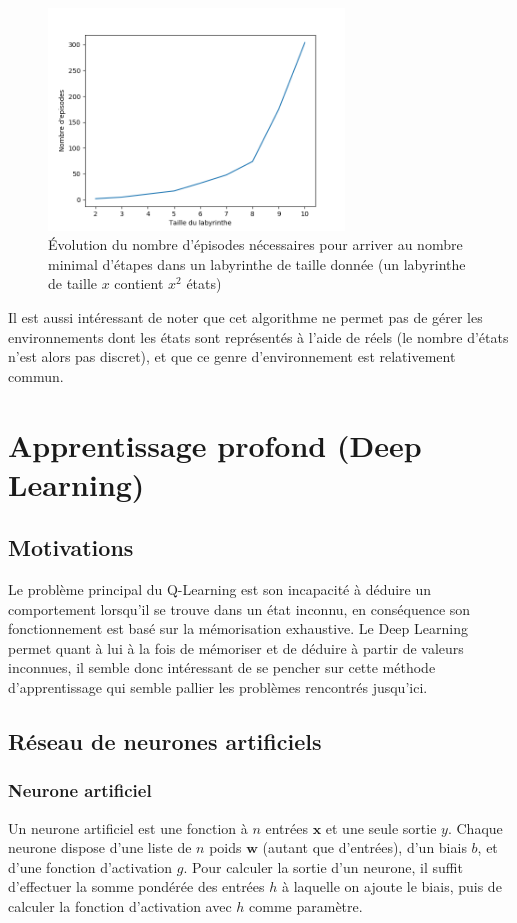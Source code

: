 \begin{figure}
    \centering
    \includegraphics[width=0.7\textwidth]{images/graph_ep_maze.png}
    \caption{Évolution du nombre d'épisodes nécessaires pour arriver au nombre minimal d'étapes dans un labyrinthe de taille donnée (un labyrinthe de taille $x$ contient $x^2$ états)}
\end{figure}

\par
Il est aussi intéressant de noter que cet algorithme ne permet pas de gérer les environnements dont les états sont représentés à l'aide de réels (le nombre d'états n'est alors pas discret), et que ce genre d'environnement est relativement commun.


\section{Apprentissage profond (Deep Learning)}
\subsection{Motivations}
Le problème principal du Q-Learning est son incapacité à déduire un comportement lorsqu'il se trouve dans un état inconnu, en conséquence son fonctionnement est basé sur la mémorisation exhaustive.
Le Deep Learning permet quant à lui à la fois de mémoriser et de déduire à partir de valeurs inconnues, il semble donc intéressant de se pencher sur cette méthode d'apprentissage qui semble pallier les problèmes rencontrés jusqu'ici.

\subsection{Réseau de neurones artificiels}
\subsubsection{Neurone artificiel}
Un neurone artificiel est une fonction à $n$ entrées $\mathbf{x}$ et une seule sortie $y$. Chaque neurone dispose d'une liste de $n$ poids $\mathbf{w}$ (autant que d'entrées), d'un biais $b$, et d'une fonction d'activation $g$. Pour calculer la sortie d'un neurone, il suffit d'effectuer la somme pondérée des entrées $h$ à laquelle on ajoute le biais, puis de calculer la fonction d'activation avec $h$ comme paramètre.

